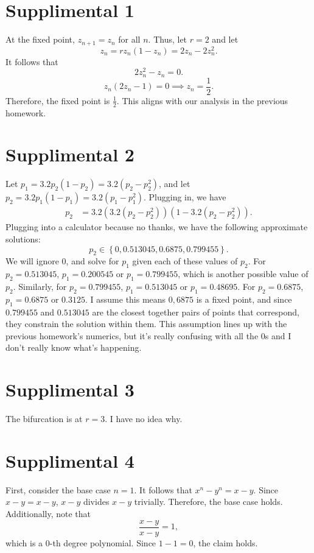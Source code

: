 \documentclass[11pt, letterpaper]{report}
\begin{document}
\section*{Supplimental 1}
At the fixed point, $z_{n+1}=z_n$ for all $n$. Thus, let $r=2$ and let
\[
	z_n = rz_n(1-z_n)=2z_n-2z_n^2
.\]
It follows that
\[
	2z_n^2-z_n=0
.\]
\[
	z_n(2z_n-1)=0\implies z_n=\frac{1}{2}
.\]
Therefore, the fixed point is $\frac{1}{2}$. This aligns with our analysis in the previous homework.
\section*{Supplimental 2}
Let $p_1 = 3.2p_2(1-p_2)=3.2(p_2-p_2^2)$, and let $p_2=3.2p_1(1-p_1)=3.2(p_1-p_1^2)$. Plugging in, we have
\begin{align*}
	p_2&=3.2\left( 3.2\left( p_2-p_2^2 \right)  \right) \left( 1-3.2\left( p_2-p_2^2 \right)  \right)
.\end{align*}
Plugging into a calculator because no thanks, we have the following approximate solutions:
\[
	p_2\in \left\{ 0,0.513045,0.6875,0.799455 \right\} 
.\]
We will ignore $0$, and solve for $p_1$ given each of these values of $p_2$. For $p_2=0.513045$, $p_1=0.200545$ or $p_1=0.799455$, which is another possible value of $p_2$. Similarly, for $p_2=0.799455$, $p_1=0.513045$ or $p_1=0.48695$. For $p_2=0.6875$, $p_1=0.6875$ or $0.3125$. I assume this means $0,6875$ is a fixed point, and since $0.799455$ and $0.513045$ are the closest together pairs of points that correspond, they constrain the solution within them. This assumption lines up with the previous homework's numerics, but it's really confusing with all the 0s and I don't really know what's happening.
\section*{Supplimental 3}
The bifurcation is at $r=3$. I have no idea why.
\section*{Supplimental 4}
First, consider the base case $n=1$. It follows that $x^n-y^n=x-y$. Since $x-y=x-y$, $x-y$ divides $x-y$ trivially. Therefore, the base case holds. Additionally, note that
\[
	\frac{x-y}{x-y}=1
,\]
which is a $0$-th degree polynomial. Since $1-1=0$, the claim holds.
\end{document}
